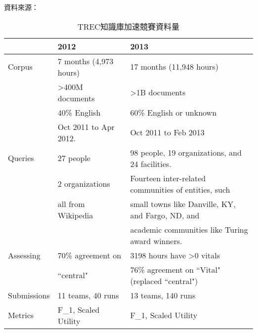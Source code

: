 \begin{table}
    \caption{TREC知識庫加速競賽資料量}
    \label{t:kba-corps}
    \centering
    資料來源：\cite{kba2013}
    \begin{center}
    \footnotesize
    \begin{tabular}{|l|l|l|}
        \hline
            & 2012 & 2013 \\ \hline
        Corpus & 7 months (4,973 hours) & 17 months (11,948 hours)\\
            & >400M documents & >1B documents\\
            & 40\% English & 60\% English or unknown\\
        & Oct 2011 to Apr 2012. & Oct 2011 to Feb 2013\\
        \hline
        Queries & 27 people & 98 people, 19 organizations, and 24 facilities. \\
                & 2 organizations & Fourteen inter-related communities of entities, such \\
                & all from Wikipedia & small towns like Danville, KY, and Fargo, ND, and \\
        & & academic communities like Turing award winners. \\
        Assessing & 70\% agreement on & 3198 hours have >0 vitals \\
        & ``central" & 76\% agreement on ``Vital" (replaced ``central") \\
        \hline
        Submissions & 11 teams, 40 runs & 13 teams, 140 runs \\
        \hline
        Metrics & F\_1, Scaled Utility & F\_1, Scaled Utility \\
        \hline
    \end{tabular}
    \end{center}
\end{table}
